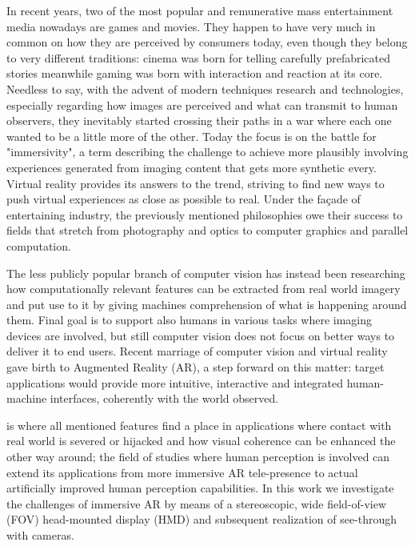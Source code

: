 \documentclass[12pt, a4paper]{article}
\begin{document}
In recent years, two of the most popular and remunerative mass entertainment media nowadays are games and movies. They happen to have very much in common on how they are perceived by consumers today, even though they belong to very different traditions: cinema was born for telling carefully prefabricated stories meanwhile gaming was born with interaction and reaction at its core. Needless to say, with the advent of modern techniques research and technologies, especially regarding how images are perceived and what can transmit to human observers, they inevitably started crossing their paths in a war where each one wanted to be a little more of the other. Today the focus is on the battle for "immersivity", a term describing the challenge to achieve more plausibly involving experiences generated from imaging content that gets more synthetic every. Virtual reality provides its answers to the trend, striving to find new ways to push virtual experiences as close as possible to real. Under the façade of entertaining industry, the previously mentioned philosophies owe their success to fields that stretch from photography and optics to computer graphics and parallel computation. \par
The less publicly popular branch of computer vision has instead been researching how computationally relevant features can be extracted from real world imagery and put use to it by giving machines comprehension of what is happening around them. Final goal is to support also humans in various tasks where imaging devices are involved, but still computer vision does not focus on better ways to deliver it to end users. Recent marriage of computer vision and virtual reality gave birth to Augmented Reality (AR), a step forward on this matter: target applications would provide more intuitive, interactive and integrated human-machine interfaces, coherently with the world observed.\par
is where all mentioned features find a place in applications where contact with real world is severed or hijacked and how visual coherence can be enhanced the other way around; the field of studies where human perception is involved can extend its applications from more immersive AR tele-presence to actual artificially improved human perception capabilities. In this work we investigate the challenges of immersive AR by means of a stereoscopic, wide field-of-view (FOV) head-mounted display (HMD) and subsequent realization of see-through with cameras.
\end{document}
